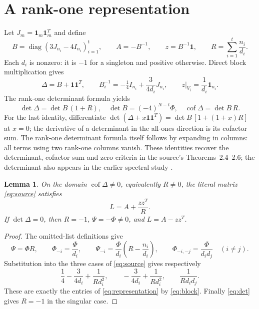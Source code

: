 \documentclass[11pt]{article}
\newtheorem{lemma}[theorem]{Lemma}
\newcommand{\cof}{\operatorname{cof}}
\newcommand{\diag}{\operatorname{diag}}
\newcommand{\one}{\mathbf{1}}
\begin{document}
\section{A rank-one representation}
Let $J_m=\one_m\one_m^T$ and define
\[
 B=\diag(3J_{n_i}-4I_{n_i})_{i=1}^t,\qquad
 A=-B^{-1},\qquad z=B^{-1}\one,\qquad
 R=\sum_{i=1}^t\frac{n_i}{d_i}.
\]
Each $d_i$ is nonzero: it is $-1$ for a singleton and positive otherwise.
Direct block multiplication gives
\begin{equation}\label{eq:block}
 \Delta=B+\one\one^T,\qquad
 B_i^{-1}=-\tfrac14 I_{n_i}+\frac{3}{4d_i}J_{n_i},\qquad
 z|_{V_i}=\frac1{d_i}\one_{n_i}.
\end{equation}
The rank-one determinant formula yields
\begin{equation}\label{eq:det}
 \det\Delta=\det B\,(1+R),\quad
 \det B=(-4)^{N-t}\Phi,\quad
 \cof\Delta=\det B\,R.
\end{equation}
For the last identity, differentiate
$\det(\Delta+x\one\one^T)=\det B\,[1+(1+x)R]$ at $x=0$;
the derivative of a determinant in the all-ones direction is its cofactor sum.
The rank-one determinant formula itself follows by expanding in columns:
all terms using two rank-one columns vanish.
These identities recover the determinant, cofactor sum and zero criteria
in the source's Theorems~2.4--2.6; the determinant also appears in the earlier
spectral study \cite[Corollary~3.5]{DMspectral}.

\begin{lemma}\label{lem:representation}
On the domain $\cof\Delta\ne0$, equivalently $R\ne0$, the literal matrix
\eqref{eq:source} satisfies
\begin{equation}\label{eq:representation}
 L=A+\frac{zz^T}{R}.
\end{equation}
If $\det\Delta=0$, then $R=-1$, $\Psi=-\Phi\ne0$, and $L=A-zz^T$.
\end{lemma}
\begin{proof}
The omitted-list definitions give
\[
 \Psi=\Phi R,\qquad
 \Phi_{-i}=\frac{\Phi}{d_i},\qquad
 \Psi_{-i}=\frac{\Phi}{d_i}\left(R-\frac{n_i}{d_i}\right),\qquad
 \Phi_{-i,-j}=\frac{\Phi}{d_id_j}\quad(i\ne j).
\]
Substitution into the three cases of \eqref{eq:source} gives respectively
\[
 \frac14-\frac{3}{4d_i}+\frac1{Rd_i^2},\qquad
 -\frac{3}{4d_i}+\frac1{Rd_i^2},\qquad
 \frac1{Rd_id_j}.
\]
These are exactly the entries of \eqref{eq:representation} by \eqref{eq:block}.
Finally \eqref{eq:det} gives $R=-1$ in the singular case.
\end{proof}
\end{document}
